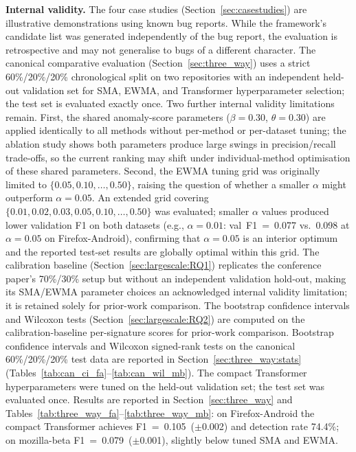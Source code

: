 \documentclass[a4paper,fleqn]{cas-sc}
\theoremstyle{plain}
\begin{document}
\textbf{Internal validity.}
The four case studies (Section~\ref{sec:casestudies}) are illustrative
demonstrations using known bug reports.
While the framework's candidate list was generated independently of the
bug report, the evaluation is retrospective and may not generalise to bugs
of a different character.
The canonical comparative evaluation (Section~\ref{sec:three_way})
uses a strict 60\%/20\%/20\% chronological split on two repositories with
an independent held-out validation set for SMA, EWMA, and Transformer
hyperparameter selection; the test set is evaluated exactly once.
Two further internal validity limitations remain.
First, the shared anomaly-score parameters ($\beta=0.30$, $\theta=0.30$)
are applied identically to all methods without per-method or per-dataset
tuning; the ablation study shows both parameters produce large swings in
precision/recall trade-offs, so the current ranking may shift under
individual-method optimisation of these shared parameters.
Second, the EWMA tuning grid was originally limited to
$\{0.05, 0.10, \ldots, 0.50\}$, raising the question of whether a smaller
$\alpha$ might outperform $\alpha=0.05$.
An extended grid covering $\{0.01, 0.02, 0.03, 0.05, 0.10, \ldots, 0.50\}$
was evaluated; smaller $\alpha$ values produced lower validation F1 on both
datasets (e.g., $\alpha=0.01$: val~F1~=~0.077 vs.~0.098 at $\alpha=0.05$
on Firefox-Android), confirming that $\alpha=0.05$ is an interior
optimum and the reported test-set results are globally optimal within this
grid.
The calibration baseline (Section~\ref{sec:largescale:RQ1}) replicates the
conference paper's 70\%/30\% setup but without an independent validation
hold-out, making its SMA/EWMA parameter choices an acknowledged internal
validity limitation; it is retained solely for prior-work comparison.
The bootstrap confidence intervals and Wilcoxon tests
(Section~\ref{sec:largescale:RQ2}) are computed on the calibration-baseline
per-signature scores for prior-work comparison.
Bootstrap confidence intervals and Wilcoxon signed-rank tests on the
canonical 60\%/20\%/20\% test data are reported in
Section~\ref{sec:three_way:stats}
(Tables~\ref{tab:can_ci_fa}--\ref{tab:can_wil_mb}).
The compact Transformer hyperparameters were tuned on the held-out
validation set; the test set was evaluated once.
Results are reported in Section~\ref{sec:three_way} and
Tables~\ref{tab:three_way_fa}--\ref{tab:three_way_mb}:
on Firefox-Android the compact Transformer achieves F1~=~0.105~($\pm$0.002)
and detection rate 74.4\%; on mozilla-beta F1~=~0.079~($\pm$0.001), slightly
below tuned SMA and EWMA.
\end{document}
